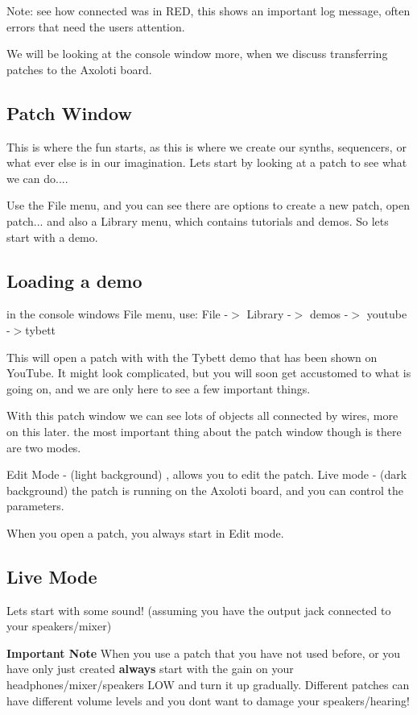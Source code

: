 Note\+: see how connected was in R\+ED, this shows an important log message, often errors that need the users attention.

We will be looking at the console window more, when we discuss transferring patches to the Axoloti board.\hypertarget{axo_gui_axo_gui_axoloti_patch}{}\subsection{Patch Window}\label{axo_gui_axo_gui_axoloti_patch}
This is where the fun starts, as this is where we create our synths, sequencers, or what ever else is in our imagination. Lets start by looking at a patch to see what we can do....

Use the File menu, and you can see there are options to create a new patch, open patch... and also a Library menu, which contains tutorials and demos. So lets start with a demo. \hypertarget{axo_gui_axo_gui_axoloti_loading_demo}{}\subsection{Loading a demo}\label{axo_gui_axo_gui_axoloti_loading_demo}
in the console window\textquotesingle{}s File menu, use\+: File -\/$>$ Library -\/$>$ demos -\/$>$ youtube -\/$>$tybett

This will open a patch with with the Tybett demo that has been shown on You\+Tube. It might look complicated, but you will soon get accustomed to what is going on, and we are only here to see a few important things.

With this patch window we can see lots of objects all connected by wires, more on this later. the most important thing about the patch window though is there are two modes.

Edit Mode -\/ (light background) , allows you to edit the patch. Live mode -\/ (dark background) the patch is running on the Axoloti board, and you can control the parameters.

When you open a patch, you always start in Edit mode.\hypertarget{axo_gui_axo_gui_axoloti_live_mode}{}\subsection{Live Mode}\label{axo_gui_axo_gui_axoloti_live_mode}
Lets start with some sound! (assuming you have the output jack connected to your speakers/mixer)

{\bfseries Important Note} When you use a patch that you have not used before, or you have only just created {\bfseries always} start with the gain on your headphones/mixer/speakers L\+OW and turn it up gradually. Different patches can have different volume levels and you don\textquotesingle{}t want to damage your speakers/hearing!

